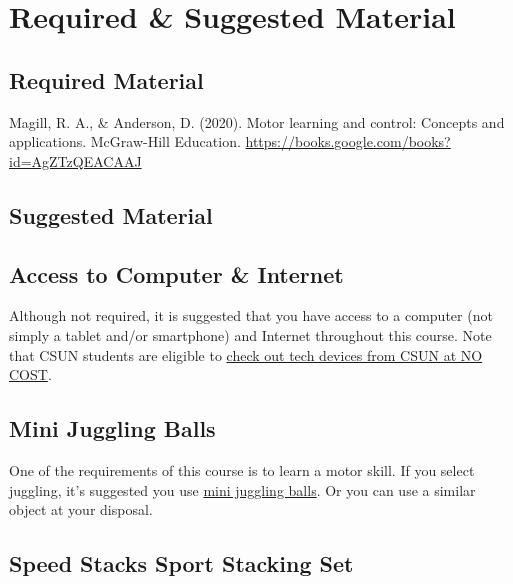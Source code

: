 \documentclass[11pt,]{article}
\begin{document}
\hypertarget{required-suggested-material}{%
\section{Required \& Suggested
Material}\label{required-suggested-material}}

\hypertarget{required-material}{%
\subsection{Required Material}\label{required-material}}

Magill, R. A., \& Anderson, D. (2020). Motor learning and control:
Concepts and applications. McGraw-Hill Education.
\url{https://books.google.com/books?id=AgZTzQEACAAJ}

\hypertarget{suggested-material}{%
\subsection{Suggested Material}\label{suggested-material}}

\hypertarget{access-to-computer-internet}{%
\subsection{Access to Computer \&
Internet}\label{access-to-computer-internet}}

Although not required, it is suggested that you have access to a
computer (not simply a tablet and/or smartphone) and Internet throughout
this course. Note that CSUN students are eligible to
\href{https://www.csun.edu/it/device-loaner-program}{check out tech
devices from CSUN at NO COST}.

\hypertarget{mini-juggling-balls}{%
\subsection{Mini Juggling Balls}\label{mini-juggling-balls}}

One of the requirements of this course is to learn a motor skill. If you
select juggling, it's suggested you use \href{http://goo.gl/X3EjLE}{mini
juggling balls}. Or you can use a similar object at your disposal.

\hypertarget{speed-stacks-sport-stacking-set}{%
\subsection{Speed Stacks Sport Stacking
Set}\label{speed-stacks-sport-stacking-set}}
\end{document}

